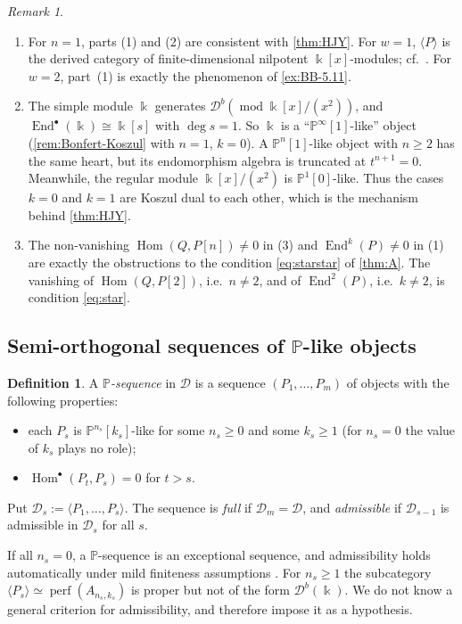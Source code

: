 \documentclass[11pt,reqno]{amsart}
\theoremstyle{plain}
\theoremstyle{definition}
\newtheorem{definition}[theorem]{Definition}
\theoremstyle{remark}
\newtheorem{remark}[theorem]{Remark}
\newcommand{\kk}{\Bbbk}
\DeclareMathOperator{\Hom}{Hom}
\DeclareMathOperator{\End}{End}
\newcommand{\modd}{\operatorname{mod}}
\newcommand{\Db}{\mathcal{D}^b}
\newcommand{\thick}[1]{\langle #1\rangle}
\newcommand{\Pn}[2]{\mathbb{P}^{#1}[#2]}
\newcommand{\cD}{\mathcal{D}}
\begin{document}
\begin{remark}\label{rem:koszul}
\leavevmode
\begin{enumerate}
\item For $n=1$, parts (1) and (2) are consistent with \cref{thm:HJY}. For $w=1$, $\thick P$ is the derived category of finite-dimensional nilpotent $\kk[x]$-modules; cf.\ \cite[Lemma~3.11(3), Cor.~4.16(2)]{Bonf26}. For $w=2$, part~(1) is exactly the phenomenon of \cref{ex:BB-5.11}.
\item The simple module $\kk$ generates $\Db(\modd\kk[x]/(x^2))$, and $\End^\bullet(\kk)\cong\kk[s]$ with $\deg s=1$. So $\kk$ is a ``$\Pn\infty1$-like'' object (\cref{rem:Bonfert-Koszul} with $n=1$, $k=0$). A $\Pn n1$-like object with $n\ge2$ has the same heart, but its endomorphism algebra is truncated at $t^{n+1}=0$. Meanwhile, the regular module $\kk[x]/(x^2)$ is $\Pn10$-like. Thus the cases $k=0$ and $k=1$ are Koszul dual to each other, which is the mechanism behind \cref{thm:HJY}.
\item The non-vanishing $\Hom(Q,P[n])\ne0$ in (3) and $\End^{k}(P)\ne0$ in (1) are exactly the obstructions to the condition \eqref{eq:starstar} of \cref{thm:A}. The vanishing of $\Hom(Q,P[2])$, i.e.\ $n\ne2$, and of $\End^2(P)$, i.e.\ $k\ne2$, is condition \eqref{eq:star}.
\end{enumerate}
\end{remark}


\subsection{Semi-orthogonal sequences of \texorpdfstring{$\mathbb{P}$}{P}-like objects}\label{sec:P-sequences}


\begin{definition}\label{def:P-sequence}
A \emph{$\mathbb{P}$-sequence} in $\cD$ is a sequence $(P_1,\dots,P_m)$ of objects with the following properties:
\begin{itemize}
\item each $P_s$ is $\Pn{n_s}{k_s}$-like for some $n_s\ge0$ and some $k_s\ge1$ (for $n_s=0$ the value of $k_s$ plays no role);
\item $\Hom^\bullet(P_t,P_s)=0$ for $t>s$.
\end{itemize}
Put $\cD_s:=\thick{P_1,\dots,P_s}$. The sequence is \emph{full} if $\cD_m=\cD$, and \emph{admissible} if $\cD_{s-1}$ is admissible in $\cD_s$ for all $s$.
\end{definition}

If all $n_s=0$, a $\mathbb{P}$-sequence is an exceptional sequence, and admissibility holds automatically under mild finiteness assumptions \cite{Bon89}. For $n_s\ge1$ the subcategory $\thick{P_s}\simeq\operatorname{perf}(A_{n_s,k_s})$ is proper but not of the form $\Db(\kk)$. We do not know a general criterion for admissibility, and therefore impose it as a hypothesis.
\end{document}
